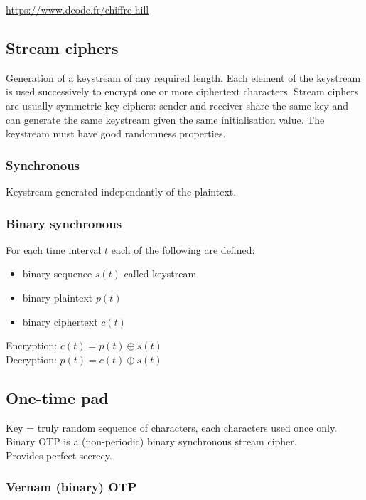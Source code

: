 \documentclass{article}
\begin{document}
\url{https://www.dcode.fr/chiffre-hill}


\subsection{Stream ciphers}

Generation of a keystream of any required length. Each element of the keystream is used successively to encrypt one or more ciphertext characters. Stream ciphers are usually symmetric key ciphers: sender and receiver share the same key and can generate the same keystream given the same initialisation value. The keystream must have good randomness properties.\\

\subsubsection{Synchronous}

Keystream generated independantly of the plaintext.

\subsubsection{Binary synchronous}

For each time interval $t$ each of the following are defined:
\begin{itemize}
    \item binary sequence $s(t)$ called keystream
    \item binary plaintext $p(t)$
    \item binary ciphertext $c(t)$
\end{itemize}
Encryption: $c(t) = p(t) \oplus s(t)$\\
Decryption: $p(t) = c(t) \oplus s(t)$\\

\subsection{One-time pad}

Key = truly random sequence of characters, each characters used once only. Binary OTP is a (non-periodic) binary synchronous stream cipher. \\
Provides perfect secrecy.

\subsubsection{Vernam (binary) OTP}
\end{document}

